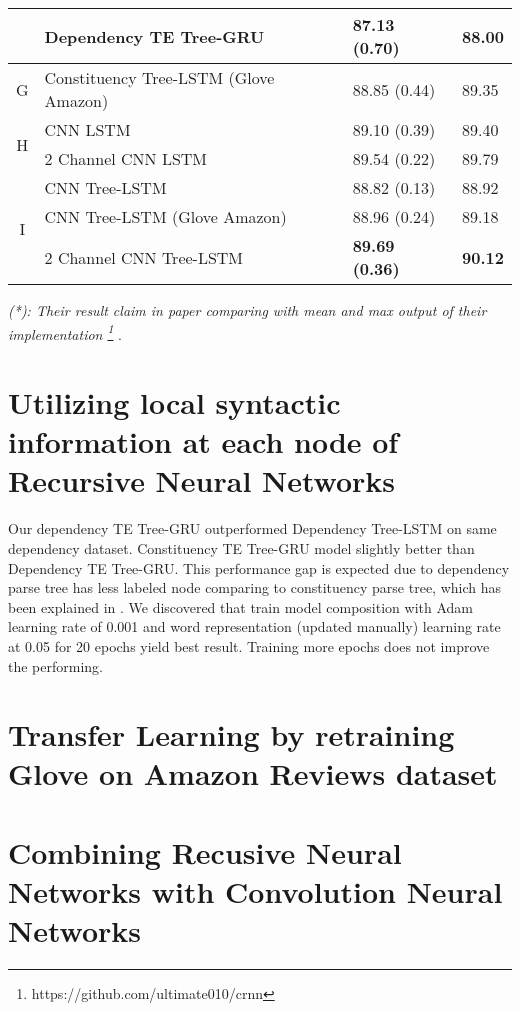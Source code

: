 \begin{table}[H]
\begin{tabular}{c|lll}
		  & Dependency TE Tree-GRU                   & 87.13 (0.70)  & 88.00\Bstrut \\ 
\hline
\hline
		\multirow{1}{*}{G} & Constituency Tree-LSTM  \cite{treeLSTM} (Glove Amazon) & 88.85 (0.44) & 89.35\Tstrut\Bstrut \\
\hline
\hline
		\multirow{2}{*}{H} & CNN LSTM 								& 89.10 (0.39)  & 89.40 \Tstrut  \\
		& 2 Channel CNN LSTM						& 89.54	(0.22) & 89.79	\\
\hline 
		\multirow{3}{*}{I} & CNN Tree-LSTM                            & 88.82 (0.13) & 88.92 \\
		& CNN Tree-LSTM (Glove Amazon) 			& 88.96 (0.24) & 89.18 \\
		& 2 Channel CNN Tree-LSTM  				& \textbf{89.69 (0.36)} & \textbf{90.12}
	\end{tabular}
\end{table}

\textit{(*): Their result claim in paper comparing with mean and max output of their implementation
\footnote{https://github.com/ultimate010/crnn}} .


\section{Utilizing local syntactic information at each node of Recursive Neural Networks}
Our dependency TE Tree-GRU outperformed Dependency Tree-LSTM on same dependency dataset. Constituency TE Tree-GRU model slightly better than Dependency TE Tree-GRU. This performance gap is expected due to dependency parse tree has less labeled node comparing to constituency parse tree, which has been explained in  \cite{treeLSTM}. We discovered that train model composition with Adam learning rate of 0.001 and word representation (updated manually) learning rate at 0.05 for 20 epochs yield best result. Training more epochs does not improve the performing.
\section{Transfer Learning by retraining Glove on Amazon Reviews dataset}
\section{Combining Recusive Neural Networks with Convolution Neural Networks}
